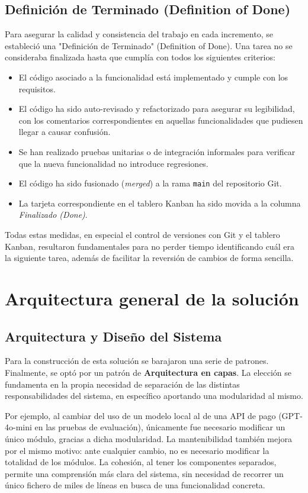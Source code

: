 \subsection{Definición de Terminado (Definition of Done)}
Para asegurar la calidad y consistencia del trabajo en cada incremento, se estableció una "Definición de Terminado" (Definition of Done). Una tarea no se consideraba finalizada hasta que cumplía con todos los siguientes criterios:
\begin{itemize}
    \item El código asociado a la funcionalidad está implementado y cumple con los requisitos.
    \item El código ha sido auto-revisado y refactorizado para asegurar su legibilidad, con los comentarios correspondientes en aquellas funcionalidades que pudiesen llegar a causar confusión.
    \item Se han realizado pruebas unitarias o de integración informales para verificar que la nueva funcionalidad no introduce regresiones.
    \item El código ha sido fusionado (\textit{merged}) a la rama \texttt{main} del repositorio Git.
    \item La tarjeta correspondiente en el tablero Kanban ha sido movida a la columna \textit{Finalizado (Done)}.
\end{itemize}

Todas estas medidas, en especial el control de versiones con Git y el tablero Kanban, resultaron fundamentales para no perder tiempo identificando cuál era la siguiente tarea, además de facilitar la reversión de cambios de forma sencilla.

\newpage
\section{Arquitectura general de la solución}
\subsection{Arquitectura y Diseño del Sistema}

Para la construcción de esta solución se barajaron una serie de patrones. Finalmente, se optó por un patrón de \textbf{Arquitectura en capas}.
La elección se fundamenta en la propia necesidad de separación de las distintas responsabilidades del sistema, en específico aportando una modularidad al mismo.

Por ejemplo, al cambiar del uso de un modelo local al de una API de pago (GPT-4o-mini en las pruebas de evaluación), únicamente fue necesario modificar un único módulo, gracias a dicha modularidad.
La mantenibilidad también mejora por el mismo motivo: ante cualquier cambio, no es necesario modificar la totalidad de los módulos.
La cohesión, al tener los componentes separados, permite una comprensión más clara del sistema, sin necesidad de recorrer un único fichero de miles de líneas en busca de una funcionalidad concreta.


